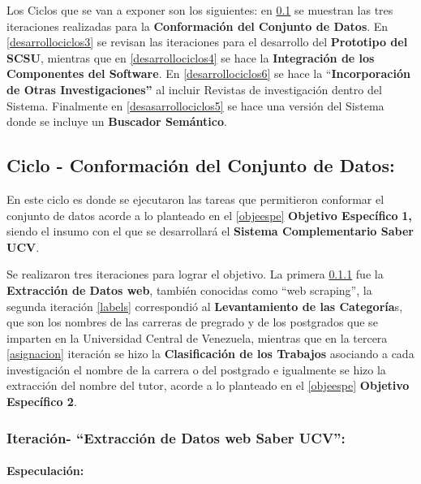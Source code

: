 \documentclass[
  12pt,
  openany]{book}
\begin{document}
Los Ciclos que se van a exponer son los siguientes: en \ref{desarrollociclos1} se muestran las tres iteraciones realizadas para la \textbf{Conformación del Conjunto de Datos}. En \ref{desarrollociclos3} se revisan las iteraciones para el desarrollo del \textbf{Prototipo del SCSU}, mientras que en \ref{desarrollociclos4} se hace la \textbf{Integración de los Componentes del Software}. En \ref{desarrollociclos6} se hace la ``\textbf{Incorporación de Otras Investigaciones''} al incluir Revistas de investigación dentro del Sistema. Finalmente en \ref{desasarrollociclos5} se hace una versión del Sistema donde se incluye un \textbf{Buscador Semántico}.

\newpage

\hypertarget{desarrollociclos1}{%
\subsection{Ciclo - Conformación del Conjunto de Datos:}\label{desarrollociclos1}}

En este ciclo es donde se ejecutaron las tareas que permitieron conformar el conjunto de datos acorde a lo planteado en el \ref{objeespe} \textbf{Objetivo Específico} \textbf{1,} siendo el insumo con el que se desarrollará el \textbf{Sistema Complementario Saber UCV}.

Se realizaron tres iteraciones para lograr el objetivo. La primera \ref{scrapeo} fue la \textbf{Extracción de Datos web}, también conocidas como ``web scraping'', la segunda iteración \ref{labels} correspondió al \textbf{Levantamiento de las Categoría}s, que son los nombres de las carreras de pregrado y de los postgrados que se imparten en la Universidad Central de Venezuela, mientras que en la tercera \ref{asignacion} iteración se hizo la \textbf{Clasificación de los Trabajos} asociando a cada investigación el nombre de la carrera o del postgrado e igualmente se hizo la extracción del nombre del tutor, acorde a lo planteado en el \ref{objeespe} \textbf{Objetivo Específico 2}.

\hypertarget{scrapeo}{%
\subsubsection{Iteración- ``Extracción de Datos web Saber UCV'':}\label{scrapeo}}

\hypertarget{especulaciuxf3n-1}{%
\paragraph{Especulación:}\label{especulaciuxf3n-1}}
\end{document}
